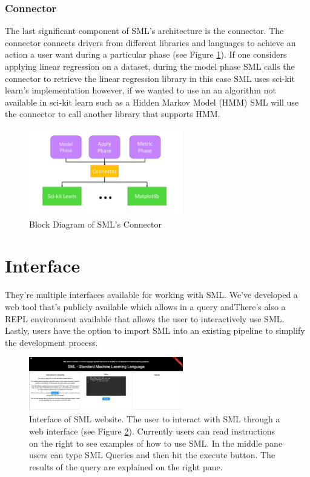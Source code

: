 \documentclass[jair,twoside,11pt,theapa]{article}
\begin{document}
\subsubsection{Connector}
The last significant component of SML's architecture is the connector. The connector connects drivers from different libraries and languages to achieve an action a user want during a particular phase (see Figure \ref{fig:SML:Connector}). If one considers applying linear regression on a dataset, during the model phase SML calls the connector to retrieve the linear regression library in this case SML uses sci-kit learn's implementation however, if we wanted to use an an algorithm not available in sci-kit learn such as a Hidden Markov Model (HMM) SML will use the connector to call another library that supports HMM.

\begin{figure}
\includegraphics[width=0.6\textwidth]{figs/connector.png}
\centering
\caption{Block Diagram of SML's Connector}
\label{fig:SML:Connector}
\end{figure}

\section{Interface}
\label{interface}

They're multiple interfaces available for working with SML. We've developed a web tool that's publicly available which allows in a query andThere's also a REPL environment available that allows the user to interactively use SML. Lastly, users have the option to import SML into an existing pipeline to simplify the development process.

\begin{figure}
\includegraphics[width=0.6\textwidth]{figs/sml-web-site.png}
\centering
\caption{Interface of SML website. The user to interact with SML through a web interface (see Figure \ref{fig:SML:website}). Currently users can read instructions on the right to see examples of how to use SML. In the middle pane users can type SML Queries and then hit the execute button. The results of the query are explained on the right pane.}
\label{fig:SML:website}
\end{figure}
\end{document}
